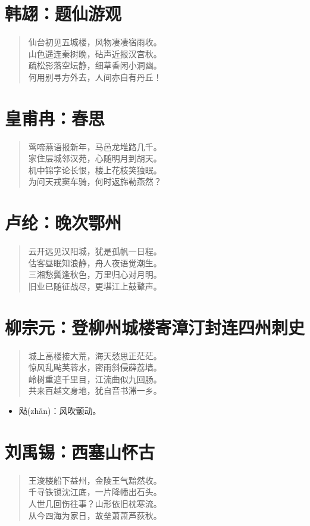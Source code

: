 \documentclass[12pt,oneside]{book}
\newenvironment{shici}{
\begin{verse}
\centering\large\hspace{12pt}}
{\end{verse}}
\begin{document}
\chapter{韩翃：题仙游观}
\begin{shici}
仙台初见五城楼，风物凄凄宿雨收。\\
山色遥连秦树晚，砧声近报汉宫秋。\\
疏松影落空坛静，细草香闲小洞幽。\\
何用别寻方外去，人间亦自有丹丘！
\end{shici}

\chapter{皇甫冉：春思}
\begin{shici}
莺啼燕语报新年，马邑龙堆路几千。\\
家住层城邻汉苑，心随明月到胡天。\\
机中锦字论长恨，楼上花枝笑独眠。\\
为问天戎窦车骑，何时返旆勒燕然？
\end{shici}

\chapter{卢纶：晚次鄂州}
\begin{shici}
云开远见汉阳城，犹是孤帆一日程。\\
估客昼眠知浪静，舟人夜语觉潮生。\\
三湘愁鬓逢秋色，万里归心对月明。\\
旧业已随征战尽，更堪江上鼓鼙声。
\end{shici}

\chapter{柳宗元：登柳州城楼寄漳汀封连四州刺史}
\begin{shici}
城上高楼接大荒，海天愁思正茫茫。\\
惊风乱飐芙蓉水，密雨斜侵薜荔墙。\\
岭树重遮千里目，江流曲似九回肠。\\
共来百越文身地，犹自音书滞一乡。
\end{shici}

\begin{itemize}
\item 飐(zhǎn)：风吹颤动。
\end{itemize}

\chapter{刘禹锡：西塞山怀古}
\begin{shici}
王浚楼船下益州，金陵王气黯然收。\\
千寻铁锁沈江底，一片降幡出石头。\\
人世几回伤往事？山形依旧枕寒流。\\
从今四海为家日，故垒萧萧芦荻秋。
\end{shici}
\end{document}
